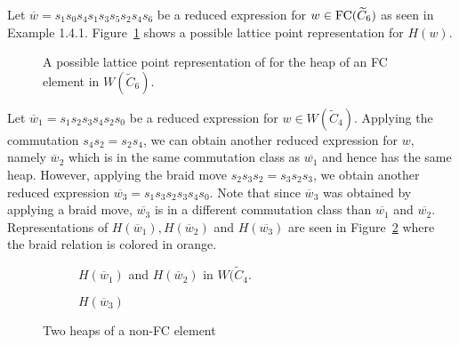 \begin{example}
	Let $\overline{w}=s_1s_0s_4s_1s_3s_5s_2s_4s_6$ be a reduced expression for $w \in \mathrm{FC}(\widetilde{C}_6)$ as seen in Example 1.4.1. Figure~\ref{fig:FC heap} shows a possible lattice point representation for $H(w)$.
\begin{figure}[h]
\centering
{}
\caption{A possible lattice point representation of for the heap of an FC element in $W(\widetilde{C}_6)$.}
\label{fig:FC heap}
\end{figure}
\end{example}

\begin{example}
Let $\overline{w}_1=s_1s_2s_3s_4s_2s_0$ be a reduced expression for $w \in W(\widetilde{C}_4)$. Applying the commutation $s_4s_2=s_2s_4$, we can obtain another reduced expression for $w$, namely $\overline{w}_2$ which is in the same commutation class as $\overline{w_1}$ and hence has the same heap. However, applying the braid move $s_2s_3s_2=s_3s_2s_3$, we obtain another reduced expression $\overline{w_3}=s_1s_3s_2s_3s_4s_0$. Note that since $\overline{w}_3$ was obtained by applying a braid move, $\overline{w_3}$ is in a different commutation class than $\overline{w_1}$ and $\overline{w_2}$. Representations of $H(\overline{w}_1), H(\overline{w}_2)$ and $H(\overline{w_3})$ are seen in Figure~\ref{fig:not FC} where the braid relation is colored in orange.

\begin{figure}[h]
\centering
\begin{subfigure}[b]{0.3\textwidth}	
\centering
{}
\caption{$H(\overline{w}_1)$ and $H(\overline{w}_2)$ in $W(\widetilde{C}_4$.}
\end{subfigure}
\begin{subfigure}[b]{0.3\textwidth}	
\centering
{}
\caption{$H(\overline{w}_3)$}
\end{subfigure}
\caption{Two heaps of a non-FC element}	
\label{fig:not FC}
\end{figure}
\end{example}



